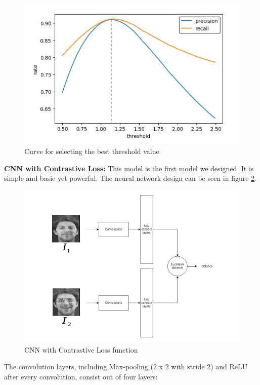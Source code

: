 \begin{figure}[H]
  \includegraphics[scale=0.6]{fig/threshold.png}
  \centering
  \caption{Curve for selecting the best threshold value}
  \label{fig:threshold}
\end{figure}

\textbf{CNN with Contrastive Loss:} This model is the first model we designed. It is simple and basic yet powerful. The neural network design can be seen in figure \ref{fig:ccncl}.

\begin{figure}[H]
  \includegraphics[scale=0.7]{fig/cnncl.png}
  \centering
  \caption{CNN with Contrastive Loss function}
  \label{fig:ccncl}
\end{figure}

The convolution layers, including Max-pooling (2 x 2 with stride 2) and ReLU after every convolution, consist out of four layers:

